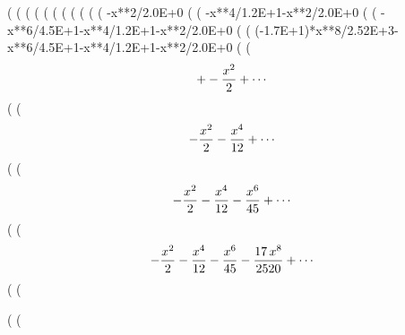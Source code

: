 (%
(%
(%
(%
(%
(%
(%
(%
(%
(%
(%
      -x**2/2.0E+0
(%
(%
      -x**4/1.2E+1-x**2/2.0E+0
(%
(%
      -x**6/4.5E+1-x**4/1.2E+1-x**2/2.0E+0
(%
(%
      (-1.7E+1)*x**8/2.52E+3-x**6/4.5E+1-x**4/1.2E+1-x**2/2.0E+0
(%
(%
$$+-{{x^2}\over{2}}+\cdots $$
(%
(%
$$-{{x^2}\over{2}}-{{x^4}\over{12}}+\cdots $$
(%
(%
$$-{{x^2}\over{2}}-{{x^4}\over{12}}-{{x^6}\over{45}}+\cdots $$
(%
(%
$$-{{x^2}\over{2}}-{{x^4}\over{12}}-{{x^6}\over{45}}-{{17\,x^8}\over{
 2520}}+\cdots $$
(%
(%

(%
(%

